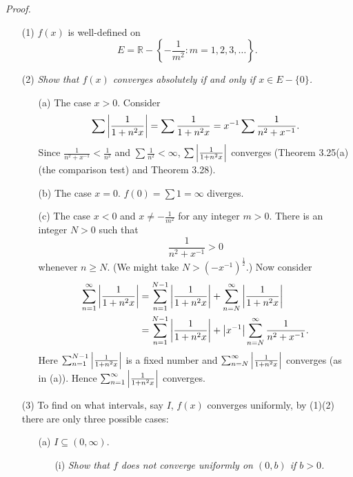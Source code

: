 \documentclass{article}
\begin{document}
\emph{Proof.}
\begin{enumerate}
\item[(1)]
  $f(x)$ is well-defined on
  \[
    E = \mathbb{R} - \left\{ -\frac{1}{m^2} : m = 1,2,3,\ldots \right\}.
  \]

\item[(2)]
  \emph{Show that $f(x)$ converges absolutely if and only if $x \in E - \{0\}$.}
  \begin{enumerate}
    \item[(a)]
    The case $x > 0$.
    Consider
    \[
      \sum \abs{\frac{1}{1+n^2x}}
      = \sum \frac{1}{1+n^2x}
      = x^{-1} \sum \frac{1}{n^2 + x^{-1}}.
    \]
    Since $\frac{1}{n^2 + x^{-1}} < \frac{1}{n^2}$ and $\sum \frac{1}{n^2} < \infty$,
    $\sum \abs{\frac{1}{1+n^2x}}$ converges
    (Theorem 3.25(a)(the comparison test) and Theorem 3.28).

    \item[(b)]
    The case $x = 0$.
    $f(0) = \sum 1 = \infty$ diverges.

    \item[(c)]
    The case $x < 0$ and $x \neq -\frac{1}{m^2}$ for any integer $m > 0$.
    There is an integer $N > 0$ such that
    \[
      \frac{1}{n^2 + x^{-1}} > 0
    \]
    whenever $n \geq N$.
    (We might take $N > (-x^{-1})^{\frac{1}{2}}$.)
    Now consider
    \begin{align*}
      \sum_{n=1}^{\infty} \abs{\frac{1}{1+n^2x}}
      &= \sum_{n=1}^{N-1} \abs{\frac{1}{1+n^2x}}
        + \sum_{n=N}^{\infty} \abs{\frac{1}{1+n^2x}} \\
      &= \sum_{n=1}^{N-1} \abs{\frac{1}{1+n^2x}}
        + \abs{x^{-1}} \sum_{n=N}^{\infty} \frac{1}{n^2 + x^{-1}}.
    \end{align*}
    Here $\sum_{n=1}^{N-1} \abs{\frac{1}{1+n^2x}}$ is a fixed number
    and $\sum_{n=N}^{\infty} \abs{\frac{1}{1+n^2x}}$ converges
    (as in (a)).
    Hence $\sum_{n=1}^{\infty} \abs{\frac{1}{1+n^2x}}$ converges.
  \end{enumerate}

\item[(3)]
  To find on what intervals, say $I$, $f(x)$ converges uniformly, by (1)(2)
  there are only three possible cases:
  \begin{enumerate}
    \item[(a)]
      $I \subseteq (0,\infty)$.
      \begin{enumerate}
        \item[(i)]
          \emph{Show that $f$ does not converge uniformly on $(0,b)$ if $b > 0$.}


\end{enumerate}
\end{enumerate}
\end{enumerate}
\end{document}
